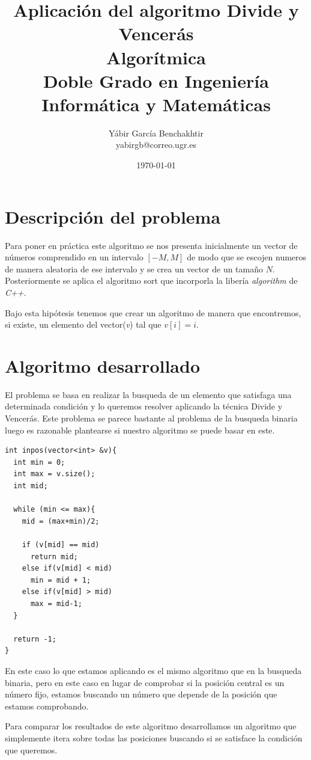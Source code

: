 \documentclass{article}
\title{Aplicación del algoritmo Divide y Vencerás \\[5mm]
  \Large Algorítmica\\
  \normalsize Doble Grado en Ingeniería Informática y Matemáticas\\[5cm]
}
\author{Yábir García Benchakhtir \\ yabirgb@correo.ugr.es \\[10cm]}
\date{\today}
\begin{document}
\maketitle

\section{Descripción del problema}

Para poner en práctica este algoritmo se nos presenta inicialmente un
vector de números comprendido en un intervalo $[-M, M]$ de modo que se
escojen numeros de manera aleatoria de ese intervalo y se crea un
vector de un tamaño $N$. Posteriormente se aplica el algoritmo sort
que incorporla la libería \textit{algorithm} de \textit{C++}.

Bajo esta hipótesis tenemos que crear un algoritmo de manera que
encontremos, si existe, un elemento del vector(\textit{v}) tal que
$v[i] = i$.

\section{Algoritmo desarrollado}

El problema se basa en realizar la busqueda de un elemento que
satisfaga una determinada condición y lo queremos resolver aplicando
la técnica Divide y Vencerás. Este problema se parece bastante al
problema de la busqueda binaria luego es razonable plantearse si
nuestro algoritmo se puede basar en este.

\begin{lstlisting}
int inpos(vector<int> &v){
  int min = 0;
  int max = v.size();
  int mid;

  while (min <= max){
    mid = (max+min)/2;
    
    if (v[mid] == mid)
      return mid;
    else if(v[mid] < mid)
      min = mid + 1;
    else if(v[mid] > mid)
      max = mid-1; 
  }

  return -1;
}
\end{lstlisting}

En este caso lo que estamos aplicando es el mismo algoritmo que en la
busqueda binaria, pero en este caso en lugar de comprobar si la
posición central es un número fijo, estamos buscando un número que
depende de la posición que estamos comprobando.

Para comparar los resultados de este algoritmo desarrollamos un
algoritmo que simplemente itera sobre todas las posiciones buscando si
se satisface la condición que queremos.
\end{document}
